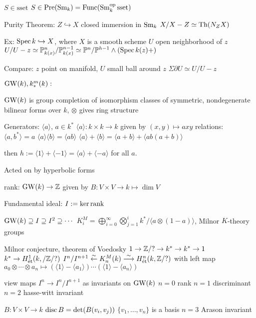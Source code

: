 $S \in \text{sset}$
$S \in \operatorname{Pre}(\operatorname{Sm}_k)= \operatorname{Func}(\operatorname{Sm}_k^\text{op} \text{sset})$


Purity Theorem: 
$Z \hookrightarrow X$ closed immersion in $\operatorname{Sm}_k$
$X/X-Z \simeq \text{Th}(N_ZX)$

Ex: $\operatorname{Spec} k \hookrightarrow X$, where $X$ is a smooth scheme
$U$ open neighborhood of $z$
$U/U-z \simeq \mathbb{P}^n_{k(x)}/\mathbb{P}^{n-1}_{k(x)} \simeq \mathbb{P}^n/\mathbb{P}^{h-1} \wedge (\operatorname{Spec} k(z)+)$

Compare: $z$ point on manifold, $U$ small ball around $z$
$\Sigma \partial U \simeq U/U-z$





$\operatorname{GW}(k), k^m_*(k):$

$\operatorname{GW}(k)$ is group completion of isomorphism classes of symmetric, nondegenerate bilinear forms over $k$, $\otimes$ gives ring structure

Generators: $\langle a \rangle$, $a \in k^*$
$\langle a \rangle: k \times k \to k$ given by $(x,y) \mapsto axy$
relations:
$\langle a,b^*\rangle= a$
$\langle a\rangle \langle b \rangle = \langle ab \rangle$
$\langle a \rangle + \langle b \rangle= \langle a+b\rangle + \langle ab(a+b)\rangle$

then $h:= \langle 1 \rangle + \langle -1 \rangle= \langle a \rangle + \langle -a \rangle$ for all $a$.

Acted on by hyperbolic forms

rank: $\operatorname{GW}(k) \to \mathbb{Z}$ given by $B: V \times V \to k \mapsto \dim V$

Fundamental ideal: $I:= \ker \operatorname{rank}$

$\operatorname{GW}(k) \supseteq I \supseteq I^2 \supseteq \cdots$
$K_i^M= \bigoplus_{i=0}^\infty \bigotimes_{j=1}^i k^*/ \langle a \otimes (1-a) \rangle$, Milnor $K$-theory groups 



Milnor conjecture, theorem of Voedosky 
$1 \to \mathbb{Z}/? \to k^* \to k^* \to 1$
$k^* \to H^1_{\text{\'et}}(k,/\mathbb{Z}/?)$
$I^n/I^{n+1} \stackrel{\sim}{\leftarrow} K_n^M(k) \stackrel{\sim}{\longrightarrow} H^n_{\text{\'et}}(k,\mathbb{Z}/?)$
with left map $a_0 \otimes \cdots \otimes a_n \mapsto (\langle 1 \rangle - \langle a_1 \rangle) \cdots (\langle 1 \rangle - \langle a_n \rangle)$

view maps $I^n \to I^n/I^{n+1}$ as invariants on $\operatorname{GW}(k)$
$n=0$ rank
$n=1$ discriminant
$n=2$ hasse-witt invariant


$B: V \times V \to k$
$\operatorname{disc} B= \det(B(v_i,v_j))$
$\{v_1,\ldots,v_n\}$ is a basis
$n=3$ Arason invariant 



